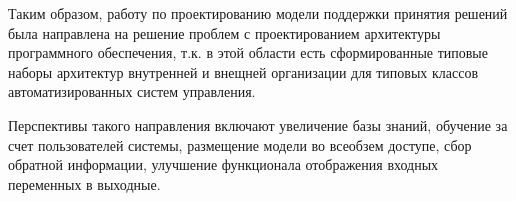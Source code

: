 Таким образом, работу по проектированию модели поддержки принятия решений была направлена на решение проблем с проектированием архитектуры программного обеспечения, т.к. в этой области есть сформированные типовые наборы архитектур внутренней и внещней организации для типовых классов автоматизированных систем управления.

Перспективы такого направления включают увеличение базы знаний, обучение за счет пользователей системы, размещение модели во всеобзем доступе, сбор обратной информации, улучшение функционала отображения входных переменных в выходные.